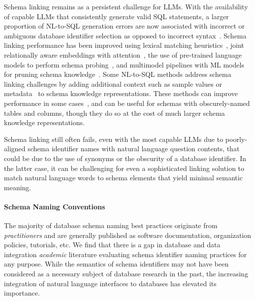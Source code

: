 Schema linking remains as a persistent challenge for LLMs.
With the availability of capable LLMs that consistently generate valid SQL statements, a larger proportion of NL-to-SQL generation errors are now associated with incorrect or ambiguous database identifier selection as opposed to incorrect syntax~\cite{49288}.
Schema linking performance has been improved using lexical matching heuristics~\cite{10023434, 10096170}, joint relationally aware embeddings with attention~\cite{wang2020rat-sql, cao-etal-2021-lgesql}, the use of pre-trained language models to perform schema probing~\cite{10.1145/3534678.3539305}, and multimodel pipelines with ML models for pruning schema knowledge~\cite{li2023resdsql}.
Some NL-to-SQL methods address schema linking challenges by adding additional context such as sample values or metadata~\cite{pourreza2023dinsql} to schema knowledge representations.
These methods can improve performance in some cases~\cite{nan2023enhancingfewshottexttosqlcapabilities}, and can be useful for schemas with obscurely-named tables and columns, though they do so at the cost of much larger schema knowledge representations.


Schema linking still often fails, even with the most capable LLMs due to poorly-aligned schema identifier names with natural language question contents, that could be due to the use of synonyms or the obscurity of a database identifier.
In the latter case, it can be challenging for even a sophisticated linking solution to match natural language words to schema elements that yield minimal semantic meaning.

\paragraph{\textbf{Schema Naming Conventions}}

The majority of database schema naming best practices originate from \emph{practitioners} and are generally published as software documentation, organization policies, tutorials, etc. 
We find that there is a gap in database and data integration \emph{academic} literature evaluating schema identifier naming practices for any purpose.
While the semantics of schema identifiers may not have been considered as a necessary subject of database research in the past, the increasing integration of natural language interfaces to databases has elevated its importance.

